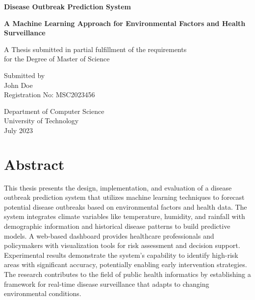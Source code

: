\documentclass[12pt,a4paper]{report}
\begin{document}
\begin{titlepage}
    \centering
    \vspace*{1cm}
    
    \textbf{\LARGE Disease Outbreak Prediction System}
    
    \vspace{1.5cm}
    
    \textbf{\large A Machine Learning Approach for Environmental Factors and Health Surveillance}
    
    \vspace{2cm}
    
    A Thesis submitted in partial fulfillment of the requirements\\
    for the Degree of Master of Science
    
    \vspace{2cm}
    
    \large Submitted by\\
    John Doe\\
    Registration No: MSC2023456
    
    \vspace{2cm}
    
    \begin{figure}[h]
        \centering
    \end{figure}
    
    \vspace{1cm}
    
    \large Department of Computer Science\\
    University of Technology\\
    July 2023
    
\end{titlepage}

\tableofcontents
\listoffigures
\listoftables

\chapter*{Abstract}
This thesis presents the design, implementation, and evaluation of a disease outbreak prediction system that utilizes machine learning techniques to forecast potential disease outbreaks based on environmental factors and health data. The system integrates climate variables like temperature, humidity, and rainfall with demographic information and historical disease patterns to build predictive models. A web-based dashboard provides healthcare professionals and policymakers with visualization tools for risk assessment and decision support. Experimental results demonstrate the system's capability to identify high-risk areas with significant accuracy, potentially enabling early intervention strategies. The research contributes to the field of public health informatics by establishing a framework for real-time disease surveillance that adapts to changing environmental conditions.
\end{document}
